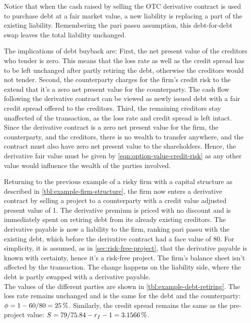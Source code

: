 \documentclass[../main.tex]{subfiles}
\begin{document}
            Notice that when the cash raised by selling the OTC derivative contract 
            is used to purchase debt at a fair market value, a new liability is replacing a part of the existing liability. 
            Remembering the pari passu assumption, this debt-for-debt swap leaves the total liability unchanged.

            The implications of debt buyback are: 
            First, the net present value of the creditors who tender is zero. 
            This means that the loss rate as well as the credit spread has to be left unchanged
            after partly retiring the debt, otherwise the creditors would not tender. 
            Second, the counterparty charges for the firm's credit risk 
            to the extend that it's a zero net present value for the counterparty. 
            The cash flow following the derivative contract can be viewed as newly issued debt
            with a fair credit spread offered to the creditors.
            Third, the remaining creditors stay unaffected of the transaction, 
            as the loss rate and credit spread is left intact. 
            Since the derivative contract is a zero net present value for the firm, 
            the counterparty, and the creditors, there is no wealth to transfer anywhere,
            and the contract must also have zero net present value to the shareholders. 
            Hence, the derivative fair value must be given by \cref{eqn:option-value-credit-risk} 
            as any other value would influence the wealth of the parties involved.

            Returning to the previous example of a risky firm with a capital structure
            as described in \cref{tbl:example-firm-structure}, 
            the firm now enters a derivative contract by selling a project to a counterparty
            with a credit value adjusted present value of 1. 
            The derivative premium is priced with no discount 
            and is immediately spent on retiring debt from its already existing creditors. 
            The derivative payable is now a liability to the firm, ranking pari passu with the existing debt, 
            which before the derivative contract had a face value of 80. 
            For simplicity, it is assumed, as in \cref{sec:risk-free-project},
            that the derivative payable is known with certainty, hence it's a risk-free project. 
            The firm's balance sheet isn't affected by the transaction. 
            The change happens on the liability side, where the debt is partly swapped with a derivative payable.\\
            The values of the different parties are shown in \cref{tbl:example-debt-retiring}. 
            The loss rate remains unchanged and is the same for the debt and the counterparty: $\phi=1-\num{60}/\num{80}=\pct{0.25}$. 
            Similarly, the credit spread remains the same as the pre-project value: $S=\num{79}/\num{75.84}-r_{f}-1=\pct{0.031566}$.
            
\end{document}
